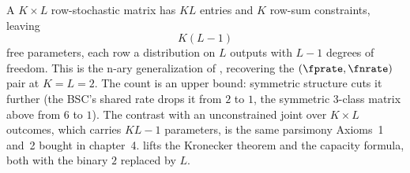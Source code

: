 A $K \times L$ row-stochastic matrix has $KL$
entries and $K$ row-sum constraints, leaving
\[
  K(L - 1)
\]
free parameters, each row a distribution on $L$ outputs with $L - 1$ degrees of
freedom. This is the n-ary generalization of ,
recovering the $(\fprate, \fnrate)$ pair at $K = L = 2$. The count is an upper
bound: symmetric structure cuts it further (the BSC's shared rate drops it from
$2$ to $1$, the symmetric 3-class matrix above from $6$ to $1$). The contrast
with an unconstrained joint over $K \times L$ outcomes, which carries $KL - 1$
parameters, is the same parsimony Axioms~1 and~2
bought in chapter~4.
 lifts the Kronecker theorem and
 the capacity formula, both with the binary $2$
replaced by $L$.
